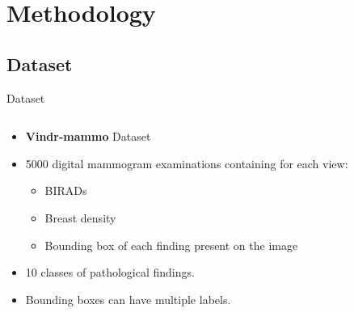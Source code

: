 \section{Methodology}


\subsection{Dataset}
\begin{frame}{Dataset}
    \begin{columns}
        \begin{column}{0.5\textwidth}
            \begin{itemize}
                \item \textbf{Vindr-mammo} Dataset 
                \item \num{5000} digital mammogram examinations containing for each view:
                \begin{itemize}
                    \item BIRADs
                    \item Breast density
                    \item Bounding box of each finding present on the image
                \end{itemize}
                \item 10 classes of pathological findings.
                \item Bounding boxes can have multiple labels.
            \end{itemize}
        \end{column}


\end{columns}
\end{frame}

